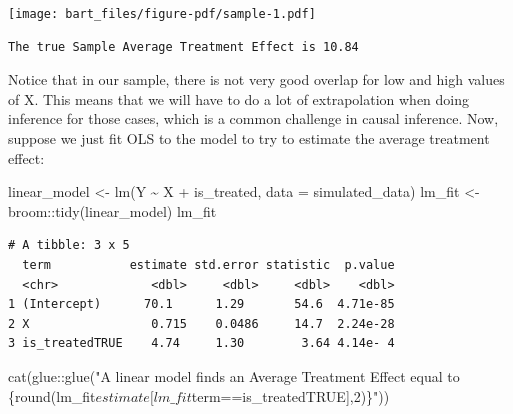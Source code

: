 \documentclass[
  letterpaper,
  DIV=11,
  numbers=noendperiod]{scrreprt}
\newenvironment{Shaded}{\begin{snugshade}}{\end{snugshade}}
\newcommand{\AttributeTok}[1]{\textcolor[rgb]{0.40,0.45,0.13}{#1}}
\newcommand{\FunctionTok}[1]{\textcolor[rgb]{0.28,0.35,0.67}{#1}}
\newcommand{\NormalTok}[1]{\textcolor[rgb]{0.00,0.23,0.31}{#1}}
\newcommand{\OtherTok}[1]{\textcolor[rgb]{0.00,0.23,0.31}{#1}}
\newcommand{\SpecialCharTok}[1]{\textcolor[rgb]{0.37,0.37,0.37}{#1}}
\newcommand{\StringTok}[1]{\textcolor[rgb]{0.13,0.47,0.30}{#1}}
\begin{document}
\texttt{[image: bart\_files/figure-pdf/sample-1.pdf]}

\begin{Shaded}
\end{Shaded}

\begin{verbatim}
The true Sample Average Treatment Effect is 10.84
\end{verbatim}

Notice that in our sample, there is not very good overlap for low and
high values of X. This means that we will have to do a lot of
extrapolation when doing inference for those cases, which is a common
challenge in causal inference. Now, suppose we just fit OLS to the model
to try to estimate the average treatment effect:

\begin{Shaded}
\begin{Highlighting}[]
\NormalTok{linear\_model }\OtherTok{\textless{}{-}} \FunctionTok{lm}\NormalTok{(Y }\SpecialCharTok{\textasciitilde{}}\NormalTok{ X }\SpecialCharTok{+}\NormalTok{ is\_treated, }\AttributeTok{data =}\NormalTok{ simulated\_data)}
\NormalTok{lm\_fit }\OtherTok{\textless{}{-}}\NormalTok{ broom}\SpecialCharTok{::}\FunctionTok{tidy}\NormalTok{(linear\_model)}
\NormalTok{lm\_fit}
\end{Highlighting}
\end{Shaded}

\begin{verbatim}
# A tibble: 3 x 5
  term           estimate std.error statistic  p.value
  <chr>             <dbl>     <dbl>     <dbl>    <dbl>
1 (Intercept)      70.1      1.29       54.6  4.71e-85
2 X                 0.715    0.0486     14.7  2.24e-28
3 is_treatedTRUE    4.74     1.30        3.64 4.14e- 4
\end{verbatim}

\begin{Shaded}
\begin{Highlighting}[]
\FunctionTok{cat}\NormalTok{(glue}\SpecialCharTok{::}\FunctionTok{glue}\NormalTok{(}\StringTok{"A linear model finds an Average Treatment Effect equal to \{round(lm\_fit$estimate[lm\_fit$term==\textquotesingle{}is\_treatedTRUE\textquotesingle{}],2)\}"}\NormalTok{))}
\end{Highlighting}
\end{Shaded}
\end{document}
